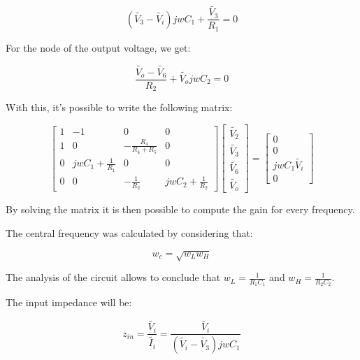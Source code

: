 \begin{equation}
        (\widetilde{V_3}-\widetilde{V_i})jwC_1 + \frac{\widetilde{V_3}}{R_1} = 0
\end{equation}

For the node of the output voltage, we get:

\begin{equation}
        \frac{\widetilde{V_o}-\widetilde{V_6}}{R_2} + \widetilde{V_o}jwC_2 = 0
\end{equation}

With this, it's possible to write the following matrix:

\begin{equation}
  \begin{bmatrix}
    1 & -1 & 0 & 0 \\
    1 & 0 & -\frac{R_4}{R_4+R_5} & 0 \\
    0 & jwC_1+\frac{1}{R_1} & 0 & 0 \\
    0 & 0 & -\frac{1}{R_2} & jwC_2+\frac{1}{R_2}  
  \end{bmatrix}
  \begin{bmatrix}
    \widetilde{V_2} \\
    \widetilde{V_3} \\
    \widetilde{V_6} \\
    \widetilde{V_o}
  \end{bmatrix}
  =
  \begin{bmatrix}
    0 \\
    0 \\
    jwC_1\widetilde{V_i} \\
    0
  \end{bmatrix}
  \label{pha}
\end{equation}

By solving the matrix it is then possible to compute the gain for every frequency.

The central frequency was calculated by considering that:

\begin{equation}
        w_c = \sqrt{w_Lw_H}
\end{equation}

The analysis of the circuit allows to conclude that $w_L=\frac{1}{R_1C_1}$ and $w_H=\frac{1}{R_2C_2}$.

The input impedance will be: 

\begin{equation}
        z_{in} = \frac{\widetilde{V_i}}{\widetilde{I_i}} = \frac{\widetilde{V_i}}{(\widetilde{V_i}-\widetilde{V_3})jwC_1}
\end{equation}

